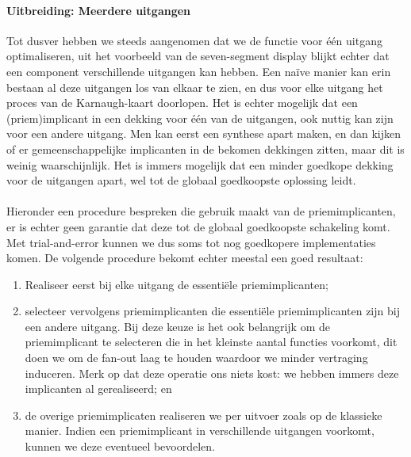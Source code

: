 
\paragraph{Uitbreiding: Meerdere uitgangen}
Tot dusver hebben we steeds aangenomen dat we de functie voor \'e\'en uitgang optimaliseren, uit het voorbeeld van de seven-segment display blijkt echter dat een component verschillende uitgangen kan hebben. Een na\"ive manier kan erin bestaan al deze uitgangen los van elkaar te zien, en dus voor elke uitgang het proces van de Karnaugh-kaart doorlopen. Het is echter mogelijk dat een (priem)implicant in een dekking voor \'e\'en van de uitgangen, ook nuttig kan zijn voor een andere uitgang. Men kan eerst een synthese apart maken, en dan kijken of er gemeenschappelijke implicanten in de bekomen dekkingen zitten, maar dit is weinig waarschijnlijk. Het is immers mogelijk dat een minder goedkope dekking voor de uitgangen apart, wel tot de globaal goedkoopste oplossing leidt.

\paragraph{}
Hieronder een procedure bespreken die gebruik maakt van de priemimplicanten, er is echter geen garantie dat deze tot de globaal goedkoopste schakeling komt. Met trial-and-error kunnen we dus soms tot nog goedkopere implementaties komen. De volgende procedure bekomt echter meestal een goed resultaat:

\begin{enumerate}
 \item Realiseer eerst bij elke uitgang de essenti\"ele priemimplicanten;
 \item selecteer vervolgens priemimplicanten die essenti\"ele priemimplicanten zijn bij een andere uitgang. Bij deze keuze is het ook belangrijk om de priemimplicant te selecteren die in het kleinste aantal functies voorkomt, dit doen we om de fan-out laag te houden waardoor we minder vertraging induceren. Merk op dat deze operatie ons niets kost: we hebben immers deze implicanten al gerealiseerd; en
 \item de overige priemimplicaten realiseren we per uitvoer zoals op de klassieke manier. Indien een priemimplicant in verschillende uitgangen voorkomt, kunnen we deze eventueel bevoordelen.
\end{enumerate}

